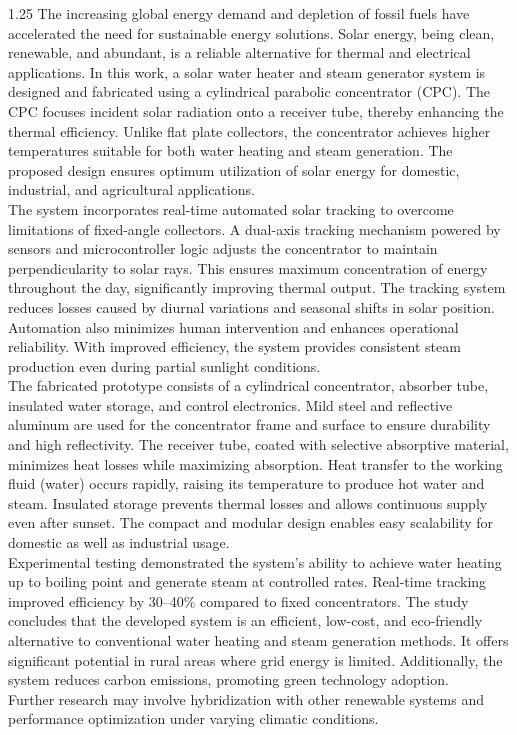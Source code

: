 \noindent
\begin{spacing}{1.25}
{\fontsize{10.2}{14}\selectfont
The increasing global energy demand and depletion of fossil fuels have accelerated the need for sustainable energy solutions. Solar energy, being clean, renewable, and abundant, is a reliable alternative for thermal and electrical applications. In this work, a solar water heater and steam generator system is designed and fabricated using a cylindrical parabolic concentrator (CPC). The CPC focuses incident solar radiation onto a receiver tube, thereby enhancing the thermal efficiency. Unlike flat plate collectors, the concentrator achieves higher temperatures suitable for both water heating and steam generation. The proposed design ensures optimum utilization of solar energy for domestic, industrial, and agricultural applications.\\[2.5mm]
The system incorporates real-time automated solar tracking to overcome limitations of fixed-angle collectors. A dual-axis tracking mechanism powered by sensors and microcontroller logic adjusts the concentrator to maintain perpendicularity to solar rays. This ensures maximum concentration of energy throughout the day, significantly improving thermal output. The tracking system reduces losses caused by diurnal variations and seasonal shifts in solar position. Automation also minimizes human intervention and enhances operational reliability. With improved efficiency, the system provides consistent steam production even during partial sunlight conditions.\\[2.5mm]
The fabricated prototype consists of a cylindrical concentrator, absorber tube, insulated water storage, and control electronics. Mild steel and reflective aluminum are used for the concentrator frame and surface to ensure durability and high reflectivity. The receiver tube, coated with selective absorptive material, minimizes heat losses while maximizing absorption. Heat transfer to the working fluid (water) occurs rapidly, raising its temperature to produce hot water and steam. Insulated storage prevents thermal losses and allows continuous supply even after sunset. The compact and modular design enables easy scalability for domestic as well as industrial usage.\\[2.5mm]
Experimental testing demonstrated the system's ability to achieve water heating up to boiling point and generate steam at controlled rates. Real-time tracking improved efficiency by 30--40\% compared to fixed concentrators. The study concludes that the developed system is an efficient, low-cost, and eco-friendly alternative to conventional water heating and steam generation methods. It offers significant potential in rural areas where grid energy is limited. Additionally, the system reduces carbon emissions, promoting green technology adoption.\\[2.5mm]
Further research may involve hybridization with other renewable systems and performance optimization under varying climatic conditions.
}
\end{spacing}
\clearpage
